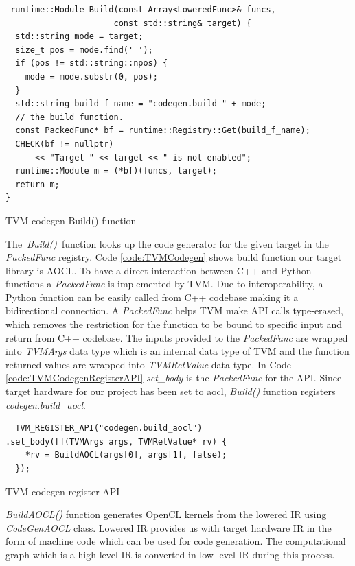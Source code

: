  \begin{code}[!htb]
 \begin{verbatim}
 runtime::Module Build(const Array<LoweredFunc>& funcs,
                      const std::string& target) {
  std::string mode = target;
  size_t pos = mode.find(' ');
  if (pos != std::string::npos) {
    mode = mode.substr(0, pos);
  }
  std::string build_f_name = "codegen.build_" + mode;
  // the build function.
  const PackedFunc* bf = runtime::Registry::Get(build_f_name);
  CHECK(bf != nullptr)
      << "Target " << target << " is not enabled";
  runtime::Module m = (*bf)(funcs, target);
  return m;
}
\end{verbatim}
\caption{TVM codegen Build() function \cite{tvm_code}}
\label{code:TVMCodegen}
\end{code}

 The \textit{Build()} function looks up the code generator for the given target in the \textit{PackedFunc} registry. Code \ref{code:TVMCodegen} shows build function our target library is AOCL. To have a direct interaction between C++ and Python functions a \textit{PackedFunc} is implemented by TVM. Due to interoperability, a Python function can be easily called from C++ codebase making it a bidirectional connection. A \textit{PackedFunc} helps TVM make API calls type-erased, which removes the restriction for the function to be bound to specific input and return from C++ codebase. The inputs provided to the \textit{PackedFunc} are wrapped into \textit{TVMArgs} data type which is an internal data type of TVM and the function returned values are wrapped into \textit{TVMRetValue} data type. In Code \ref{code:TVMCodegenRegisterAPI} \textit{set\_body} is the \textit{PackedFunc} for the API. Since target hardware for our project has been set to aocl, \textit{Build()} function registers \textit{codegen.build\_aocl}.
 
  \begin{code}[!htb]
 \begin{verbatim}
  TVM_REGISTER_API("codegen.build_aocl")
.set_body([](TVMArgs args, TVMRetValue* rv) {
    *rv = BuildAOCL(args[0], args[1], false);
  });
\end{verbatim}
\caption{TVM codegen register API \cite{tvm_code}}
\label{code:TVMCodegenRegisterAPI}
\end{code}

\textit{BuildAOCL()} function generates OpenCL kernels from the lowered IR using \textit{CodeGenAOCL} class. Lowered IR provides us with target hardware IR in the form of machine code which can be used for code generation. The computational graph which is a high-level IR is converted in low-level IR during this process.

